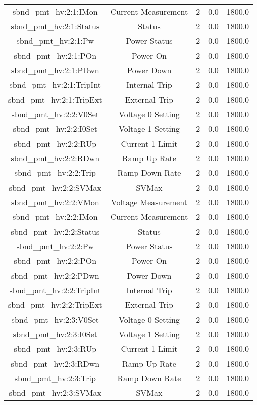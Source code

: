 \begin{table}[ptb]
\begin{tabular}{c | c c c c}
sbnd_pmt_hv:2:1:IMon & Current Measurement & 2 & 0.0 & 1800.0\\ 
sbnd_pmt_hv:2:1:Status & Status & 2 & 0.0 & 1800.0\\ 
sbnd_pmt_hv:2:1:Pw & Power Status & 2 & 0.0 & 1800.0\\ 
sbnd_pmt_hv:2:1:POn & Power On & 2 & 0.0 & 1800.0\\ 
sbnd_pmt_hv:2:1:PDwn & Power Down & 2 & 0.0 & 1800.0\\ 
sbnd_pmt_hv:2:1:TripInt & Internal Trip & 2 & 0.0 & 1800.0\\ 
sbnd_pmt_hv:2:1:TripExt & External Trip & 2 & 0.0 & 1800.0\\ 
sbnd_pmt_hv:2:2:V0Set & Voltage 0 Setting & 2 & 0.0 & 1800.0\\ 
sbnd_pmt_hv:2:2:I0Set & Voltage 1 Setting & 2 & 0.0 & 1800.0\\ 
sbnd_pmt_hv:2:2:RUp & Current 1 Limit & 2 & 0.0 & 1800.0\\ 
sbnd_pmt_hv:2:2:RDwn & Ramp Up Rate & 2 & 0.0 & 1800.0\\ 
sbnd_pmt_hv:2:2:Trip & Ramp Down Rate & 2 & 0.0 & 1800.0\\ 
sbnd_pmt_hv:2:2:SVMax & SVMax & 2 & 0.0 & 1800.0\\ 
sbnd_pmt_hv:2:2:VMon & Voltage Measurement & 2 & 0.0 & 1800.0\\ 
sbnd_pmt_hv:2:2:IMon & Current Measurement & 2 & 0.0 & 1800.0\\ 
sbnd_pmt_hv:2:2:Status & Status & 2 & 0.0 & 1800.0\\ 
sbnd_pmt_hv:2:2:Pw & Power Status & 2 & 0.0 & 1800.0\\ 
sbnd_pmt_hv:2:2:POn & Power On & 2 & 0.0 & 1800.0\\ 
sbnd_pmt_hv:2:2:PDwn & Power Down & 2 & 0.0 & 1800.0\\ 
sbnd_pmt_hv:2:2:TripInt & Internal Trip & 2 & 0.0 & 1800.0\\ 
sbnd_pmt_hv:2:2:TripExt & External Trip & 2 & 0.0 & 1800.0\\ 
sbnd_pmt_hv:2:3:V0Set & Voltage 0 Setting & 2 & 0.0 & 1800.0\\ 
sbnd_pmt_hv:2:3:I0Set & Voltage 1 Setting & 2 & 0.0 & 1800.0\\ 
sbnd_pmt_hv:2:3:RUp & Current 1 Limit & 2 & 0.0 & 1800.0\\ 
sbnd_pmt_hv:2:3:RDwn & Ramp Up Rate & 2 & 0.0 & 1800.0\\ 
sbnd_pmt_hv:2:3:Trip & Ramp Down Rate & 2 & 0.0 & 1800.0\\ 
sbnd_pmt_hv:2:3:SVMax & SVMax & 2 & 0.0 & 1800.0\\ 

\end{tabular}
\end{table}
